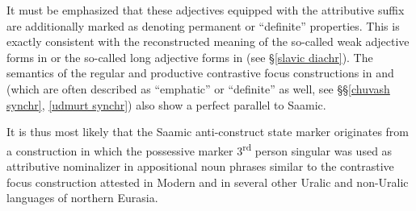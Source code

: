 {It must be emphasized that these adjectives equipped with the attributive suffix are additionally marked as denoting permanent or “definite” properties. This is exactly consistent with the reconstructed meaning of the so-called weak adjective forms in  or the so-called long adjective forms in  (see \S\ref{slavic diachr}). The semantics of the regular and productive contrastive focus constructions in  and  (which are often described as “emphatic” or “definite” as well, see \S\S\ref{chuvash synchr}, \ref{udmurt synchr}) also show a perfect parallel to Saamic.

It is thus most likely that the Saamic anti\hyp{}construct state marker originates from a construction in which the possessive marker 3\textsuperscript{rd} person singular was used as attributive nominalizer in appositional noun phrases similar to the contrastive focus construction attested in Modern  and in several other Uralic and non-Uralic languages of northern Eurasia.
 
}
